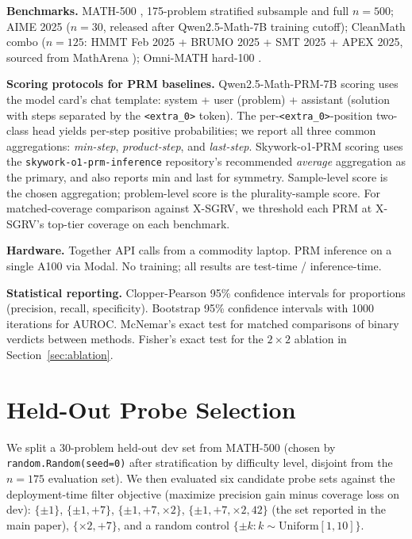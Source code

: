 \documentclass{article}
\begin{document}
\textbf{Benchmarks.} MATH-500 \citep{hendrycks2021math, lightman2024prm}, 175-problem stratified subsample and full $n{=}500$; AIME 2025 ($n{=}30$, released after Qwen2.5-Math-7B training cutoff); CleanMath combo ($n{=}125$: HMMT Feb 2025 + BRUMO 2025 + SMT 2025 + APEX 2025, sourced from MathArena \citep{matharena2025}); Omni-MATH hard-100 \citep{omnimath2024}.

\textbf{Scoring protocols for PRM baselines.} Qwen2.5-Math-PRM-7B scoring uses the model card's chat template: system + user (problem) + assistant (solution with steps separated by the \texttt{<extra\_0>} token). The per-\texttt{<extra\_0>}-position two-class head yields per-step positive probabilities; we report all three common aggregations: \emph{min-step}, \emph{product-step}, and \emph{last-step}. Skywork-o1-PRM scoring uses the \texttt{skywork-o1-prm-inference} repository's recommended \emph{average} aggregation as the primary, and also reports min and last for symmetry. Sample-level score is the chosen aggregation; problem-level score is the plurality-sample score. For matched-coverage comparison against X-SGRV, we threshold each PRM at X-SGRV's top-tier coverage on each benchmark.

\textbf{Hardware.} Together API calls from a commodity laptop. PRM inference on a single A100 via Modal. No training; all results are test-time / inference-time.

\textbf{Statistical reporting.} Clopper-Pearson 95\% confidence intervals for proportions (precision, recall, specificity). Bootstrap 95\% confidence intervals with 1000 iterations for AUROC. McNemar's exact test for matched comparisons of binary verdicts between methods. Fisher's exact test for the $2\times 2$ ablation in Section~\ref{sec:ablation}.

\section{Held-Out Probe Selection}
\label{app:probe}

We split a 30-problem held-out dev set from MATH-500 (chosen by \texttt{random.Random(seed=0)} after stratification by difficulty level, disjoint from the $n{=}175$ evaluation set). We then evaluated six candidate probe sets against the deployment-time filter objective (maximize precision gain minus coverage loss on dev): $\{\pm 1\}$, $\{\pm 1, +7\}$, $\{\pm 1, +7, \times 2\}$, $\{\pm 1, +7, \times 2, 42\}$ (the set reported in the main paper), $\{\times 2, +7\}$, and a random control $\{\pm k : k \sim \mathrm{Uniform}[1,10]\}$.
\end{document}
